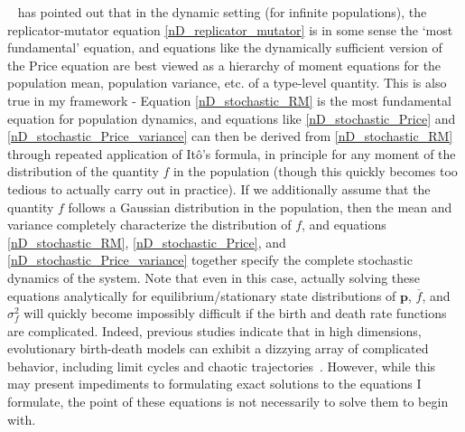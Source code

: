 ~\citet{lion_theoretical_2018} has pointed out that in the dynamic setting (for infinite populations), the replicator-mutator equation \eqref{nD_replicator_mutator} is in some sense the `most fundamental' equation, and equations like the dynamically sufficient version of the Price equation are best viewed as a hierarchy of moment equations for the population mean, population variance, etc. of a type-level quantity. This is also true in my framework - Equation \eqref{nD_stochastic_RM} is the most fundamental equation for population dynamics, and equations like \eqref{nD_stochastic_Price} and \eqref{nD_stochastic_Price_variance} can then be derived from \eqref{nD_stochastic_RM} through repeated application of It\^o's formula, in principle for any moment of the distribution of the quantity $f$ in the population (though this quickly becomes too tedious to actually carry out in practice). If we additionally assume that the quantity $f$ follows a Gaussian distribution in the population, then the mean and variance completely characterize the distribution of $f$, and equations \eqref{nD_stochastic_RM}, \eqref{nD_stochastic_Price}, and \eqref{nD_stochastic_Price_variance} together specify the complete stochastic dynamics of the system. Note that even in this case, actually solving these equations analytically for equilibrium/stationary state distributions of $\mathbf{p}$, $\overline{f}$, and $\sigma^2_f$ will quickly become impossibly difficult if the birth and death rate functions are complicated. Indeed, previous studies indicate that in high dimensions, evolutionary birth-death models can exhibit a dizzying array of complicated behavior, including limit cycles and chaotic trajectories~\citep{doebeli_diversity_2017}. However, while this may present impediments to formulating exact solutions to the equations I formulate, the point of these equations is not necessarily to solve them to begin with.

